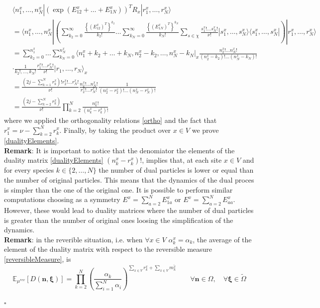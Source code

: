 \documentclass[11pt]{article}
\numberwithin{equation}{section}
\numberwithin{equation}{subsection}
\begin{document}
\begin{align*}
&\langle n_{1}^{x},\ldots,n_{N}^{x}|(\exp{(E_{12}^{x}+\ldots+E_{1N}^{x})})^{T}R_{x}|r_{1}^{x},\ldots,r_{N}^{x}\rangle\\&= \langle  n_{1}^{x},\ldots,n_{N}^{x}|\left(\sum_{k_{2}=0}^{\infty}\frac{\left\{\left(E_{12}^{x}\right)^{T}\right\}^{k_{2}}}{k_{2}!}\ldots\sum_{k_{N}=0}^{\infty}\frac{\left\{\left(E_{1N}^{x}\right)^{T}\right\}^{k_{N}}}{k_{N}!}\sum_{s\in\chi}\frac{s_{1}^{x}!\ldots s_{N}^{x}!}{\nu!}|s_{1}^{x},\ldots,s_{N}^{x}\rangle\langle s_{1}^{x},\ldots,s_{N}^{x}|\right)|r_{1}^{x},\ldots,r_{N}^{x}\rangle\\&=
\sum_{k_{2}=0}^{n_{1}^{x}}\ldots\sum_{k_{N}=0}^{n_{N}^{x}}\langle n_{1}^{x}+k_{2}+\ldots+k_{N},n_{2}^{x}-k_{2},\ldots,n_{N}^{x}-k_{N}|_{x}\frac{n_{2}^{x}!\ldots n_{N}^{x}!}{(n_{2}^{x}-k_{2})!\ldots(n_{N}^{x}-k_{N})!}
\\&\cdot 
\frac{1}{k_{2}!,\ldots,k_{N}!}\frac{r_{1}^{x}!\ldots r_{N}^{x}!}{\nu!}|r_{1},\ldots,r_{N}\rangle_{x}\\&=\frac{(2j-\sum_{k=1}^{N}r_{k}^{x})!r_{2}^{x}!\ldots r_{N }^{x}!}{\nu!}\frac{n_{2}^{x}!\ldots n_{N}^{x}!}{r_{2}^{x}!\ldots r_{N}^{x}!}\frac{1}{(n_{2}^{x}-r_{2}^{x})!\ldots (n_{N}^{x}-r_{N}^{x})!}\\&=
\frac{(2j-\sum_{k=2}^{N}r_{k}^{x})}{\nu!}\prod_{k=2}^{N}\frac{n_{k}^{x}!}{(n_{k}^{x}-r_{k}^{x})!}
\end{align*}
where we applied the orthogonality relations \eqref{ortho} and the fact that $r_{1}^{x}=\nu-\sum_{k=2}^{N}r_{k}^{x}$. Finally, by taking the product over $x\in V$ we prove \eqref{dualityElements}.\\
\newline 
\textbf{Remark}: It is important to notice that the denomiator the elements of the duality matrix \eqref{dualityElements} $(n_{k}^{x}-r_{k}^{x})!$,  implies that, at each site $x\in V$ and for every species $k\in \{2,\ldots,N\}$ the number of dual particles is lower or equal than the number of original particles. This means that the dynamics of the dual proces is simpler than the one of the original one. It is possible to perform similar computations choosing as a symmetry $E^{x}=\sum_{a=2}^{N}E_{1a}^{x}$ or $E^{x}=\sum_{a=2}^{N}E_{aa}^{x}$. However, these would lead to duality matrices where the number of dual particles is greater than the number of original ones loosing the simplification of the dynamics. 
 \newline \\
\textbf{Remark}: in the reverible situation, i.e. when $\forall x\in V$ $\alpha_{k}^{x}=\alpha_{k}$, the average of the element of the duality matrix with respect to the reversible measure \eqref{reversibleMeasure}, is
\begin{equation}
\mathbb{E}_{\mu^{rev}}\left[D(\bm{n},\bm{\xi})\right]=\prod_{k=2}^{N}\left(\frac{\alpha_{k}}{\sum_{i=1}^{N}\alpha_{i}}\right)^{\sum_{x\in V}r_{k}^{x}+\sum_{x\in V}m_{k}^{\widetilde{x}}}\qquad \forall \bm{n}\in \Omega,\quad\forall \bm{\xi}\in \widetilde{\Omega}
\end{equation}
\begin{flushright}
    $\square$
\end{flushright}
\end{document}
